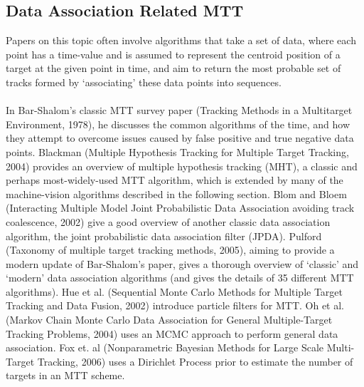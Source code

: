 \documentclass{article}
\begin{document}
\subsection*{Data Association Related MTT}
\vspace{6pt}
Papers on this topic often involve algorithms that take a set of data, where each point has a time-value and is assumed to represent the centroid position of a target at the given point in time, and aim to return the most probable set of tracks formed by `associating' these data points into sequences.\\
\\
In Bar-Shalom's classic MTT survey paper (Tracking Methods in a Multitarget Environment, 1978), he discusses the common algorithms of the time, and how they attempt to overcome issues caused by false positive and true negative data points. Blackman (Multiple Hypothesis Tracking for Multiple Target Tracking, 2004) provides an overview of multiple hypothesis tracking (MHT), a classic and perhaps most-widely-used MTT algorithm, which is extended by many of the machine-vision algorithms described in the following section. Blom and Bloem (Interacting Multiple Model Joint Probabilistic Data Association avoiding track coalescence, 2002) give a good overview of another classic data association algorithm, the joint probabilistic data association filter (JPDA). Pulford (Taxonomy of multiple target tracking methods, 2005), aiming to provide a modern update of Bar-Shalom's paper, gives a thorough overview of `classic' and `modern' data association algorithms (and gives the details of 35 different MTT algorithms). Hue et al. (Sequential Monte Carlo Methods for Multiple Target Tracking and Data Fusion, 2002) introduce particle filters for MTT. Oh et al. (Markov Chain Monte Carlo Data Association for General Multiple-Target Tracking Problems, 2004) uses an MCMC approach to perform general data association. Fox et. al (Nonparametric Bayesian Methods for Large Scale Multi-Target Tracking, 2006) uses a Dirichlet Process prior to estimate the number of targets in an MTT scheme.
\end{document}
